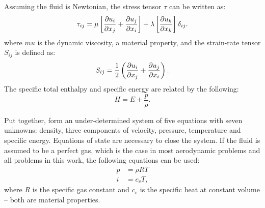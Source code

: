 Assuming the fluid is Newtonian, the stress tensor $\tau$ can be written as:
\begin{equation*}
    \tau_{ij} = \mu \left [
         \frac{\partial u_i}{\partial x_j}  +  \frac{\partial u_j}{\partial x_i} 
    \right ]
    + \lambda \left [
         \frac{\partial u_k}{\partial x_k} 
    \right ] \delta_{ij}.
\end{equation*}
where $mu$ is the dynamic viscosity, a material property, and the strain-rate tensor $S_{ij}$ is defined as:
\begin{equation*}
    S_{ij} = \frac{1}{2}\left(
         \frac{\partial u_i}{\partial x_j}  +  \frac{\partial u_j}{\partial x_i} 
    \right).
\end{equation*}
The specific total enthalpy and specific energy are related by the following:
\begin{equation*}
    H = E + \frac{p}{\rho}.
\end{equation*}

Put together,  form an under-determined system of five equations with seven unknowns: density, three components of velocity, pressure, temperature and specific energy. Equations of state are necessary to close the system. If the fluid is assumed to be a perfect gas, which is the case in most aerodynamic problems and all problems in this work, the following equations can be used:
\begin{align}
    p &= \rho R T \label{eq:state1}\\
    i &= c_v T \label{eq:state2},
\end{align}
where $R$ is the specific gas constant and $c_v$ is the specific heat at constant volume -- both are material properties.

